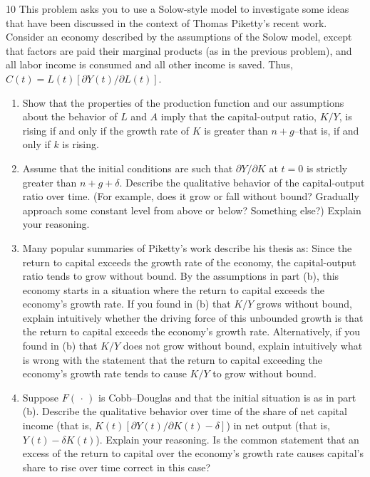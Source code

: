 \begin{problem}{10}
This problem asks you to use a Solow-style model to investigate some ideas that have been discussed
in the context of Thomas Piketty's recent work. Consider an economy described by the assumptions of the Solow model, except that
factors are paid their marginal products (as in the previous problem), and all labor income is
consumed and all other income is saved. Thus,
\(C\left(t\right)=L\left(t\right)\left[\partial Y\left(t\right)/\partial L\left(t\right)\right]\).
\begin{enumerate}[label=(\alph*)]
    \item Show that the properties of the production function and our assumptions about the behavior
    of \(L\) and \(A\) imply that the capital-output ratio, \(K/Y\), is rising if and only if
    the growth rate of \(K\) is greater than \(n+g\)--that is, if and only if \(k\) is rising.
    \item Assume that the initial conditions are such that \(\partial Y/\partial K\) at \(t=0\)
    is strictly greater than \(n+g+\delta\). Describe the qualitative behavior of the capital-output
    ratio over time. (For example, does it grow or fall without bound? Gradually approach some
    constant level from above or below? Something else?) Explain your reasoning.
    \item Many popular summaries of Piketty's work describe his thesis as: Since the return to
    capital exceeds the growth rate of the economy, the capital-output ratio tends to grow without
    bound. By the assumptions in part (b), this economy starts in a situation where the return to
    capital exceeds the economy's growth rate. If you found in (b) that \(K/Y\) grows without
    bound, explain intuitively whether the driving force of this unbounded growth is that the return
    to capital exceeds the economy's growth rate. Alternatively, if you found in (b) that \(K/Y\)
    does not grow without bound, explain intuitively what is wrong with the statement that the return
    to capital exceeding the economy's growth rate tends to cause \(K/Y\) to grow without bound.
    \item Suppose \(F\left(\,\cdot\,\right)\) is Cobb--Douglas and that the initial situation is as in
    part (b). Describe the qualitative behavior over time of the share of net capital income (that is,
    \(K\left(t\right)\left[\partial Y\left(t\right)/\partial K\left(t\right)-\delta\right]\))
    in net output (that is, \(Y\left(t\right)-\delta K\left(t\right)\)). Explain your reasoning.
    Is the common statement that an excess of the return to capital over the economy's growth rate
    causes capital's share to rise over time correct in this case?
\end{enumerate}
\end{problem}

